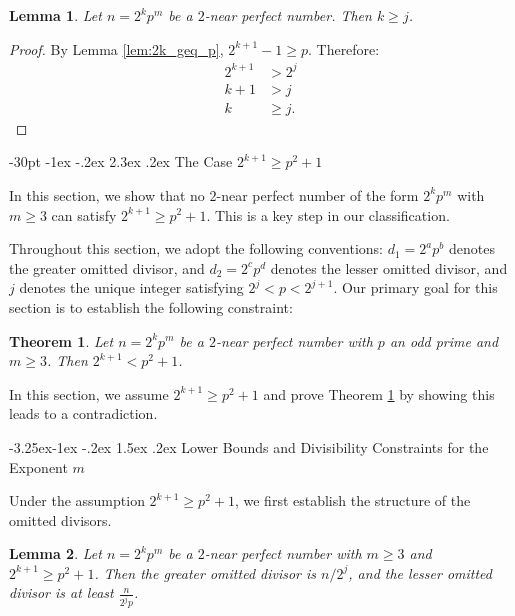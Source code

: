 \documentclass[10pt]{article}
\makeatletter
\renewcommand\section{\@startsection {section}{1}{\z@}
{-30pt \@plus -1ex \@minus -.2ex}
{2.3ex \@plus.2ex}
{\normalfont\normalsize\bfseries\boldmath}}
\renewcommand\subsection{\@startsection{subsection}{2}{\z@}
{-3.25ex\@plus -1ex \@minus -.2ex}
{1.5ex \@plus .2ex}
{\normalfont\normalsize\bfseries\boldmath}}
\newtheorem{theorem}{Theorem}
\newtheorem{lemma}{Lemma}
\theoremstyle{definition}
\makeatother
\begin{document}
\begin{lemma}\label{lem:k_geq_j}
    Let $n=2^kp^m$ be a $2$-near perfect number. Then $k\ge j$.
\end{lemma}
\begin{proof}
    By Lemma \ref{lem:2k_geq_p}, $2^{k+1}-1\ge p$. Therefore:
    \begin{align*}
        2^{k+1}&>2^j\\
        k+1&>j\\
        k&\ge j.
    \end{align*}
\end{proof}

\section{The Case $2^{k+1} \geq p^2+1$}
\label{sec:case1}

In this section, we show that no $2$-near perfect number of the form $2^kp^m$ with $m \geq 3$ can satisfy $2^{k+1} \geq p^2+1$. This is a key step in our classification.

Throughout this section, we adopt the following conventions: $d_1=2^ap^b$ denotes the greater omitted divisor, and $d_2=2^cp^d$ denotes the lesser omitted divisor, and $j$ denotes the unique integer satisfying $2^j < p < 2^{j+1}$. Our primary goal for this section is to establish the following constraint:

\begin{theorem}\label{thm:main_constraint}
Let $n=2^kp^m$ be a $2$-near perfect number with $p$ an odd prime and $m \geq 3$. Then $2^{k+1} < p^2+1$.
\end{theorem}

In this section, we assume $2^{k+1} \geq p^2+1$ and prove Theorem \ref{thm:main_constraint} by showing this leads to a contradiction. 

\subsection{Lower Bounds and Divisibility Constraints for the Exponent $m$}
\label{sec:constraints-exponent-m}

Under the assumption $2^{k+1} \geq p^2+1$, we first establish the structure of the omitted divisors.

\begin{lemma}\label{lem:divisor_structure_main}
Let $n=2^kp^m$ be a $2$-near perfect number with $m\geq 3$ and $2^{k+1}\geq p^2+1$. Then the greater omitted divisor is $n/2^j$, and the lesser omitted divisor is at least $\frac{n}{2^jp}$.
\end{lemma}
\end{document}
